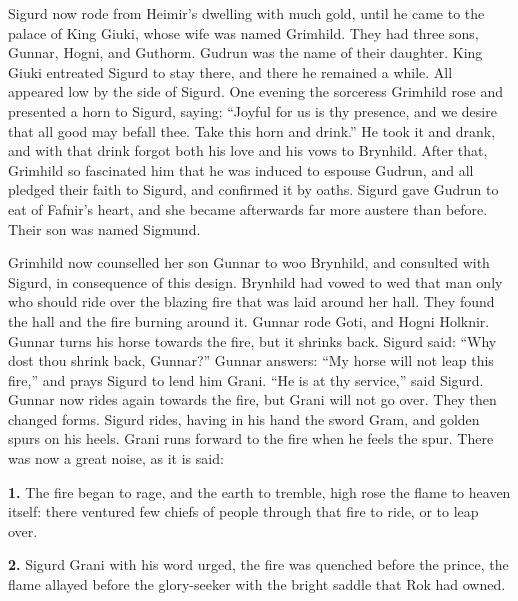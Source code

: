 Sigurd now rode from Heimir's dwelling with much gold, until he came
to the palace of King Giuki, whose wife was named Grimhild. They had
three sons, Gunnar, Hogni, and Guthorm. Gudrun was the name of their
daughter. King Giuki entreated Sigurd to stay there, and there he
remained a while. All appeared low by the side of Sigurd. One evening
the sorceress Grimhild rose and presented a horn to Sigurd, saying:
``Joyful for us is thy presence, and we desire that all good may befall
thee. Take this horn and drink.'' He took it and drank, and with that
drink forgot both his love and his vows to Brynhild. After that,
Grimhild so fascinated him that he was induced to espouse Gudrun, and
all pledged their faith to Sigurd, and confirmed it by oaths. Sigurd
gave Gudrun to eat of Fafnir's heart, and she became afterwards far
more austere than before. Their son was named Sigmund.

Grimhild now counselled her son Gunnar to woo Brynhild, and consulted
with Sigurd, in consequence of this design. Brynhild had vowed to wed
that man only who should ride over the blazing fire that was laid
around her hall. They found the hall and the fire burning around it.
Gunnar rode Goti, and Hogni Holknir. Gunnar turns his horse towards
the fire, but it shrinks back. Sigurd said: ``Why dost thou shrink
back, Gunnar?'' Gunnar answers: ``My horse will not leap this fire,''
and prays Sigurd to lend him Grani. ``He is at thy service,'' said
Sigurd. Gunnar now rides again towards the fire, but Grani will not go
over. They then changed forms. Sigurd rides, having in his hand the
sword Gram, and golden spurs on his heels. Grani runs forward to the
fire when he feels the spur. There was now a great noise, as it is
said:

\textbf{1.} The fire began to rage, and the earth to tremble, high rose the
flame to heaven itself: there ventured few chiefs of people through
that fire to ride, or to leap over.

\textbf{2.} Sigurd Grani with his word urged, the fire was quenched before
the prince, the flame allayed before the glory-seeker with the bright
saddle that Rok had owned.

